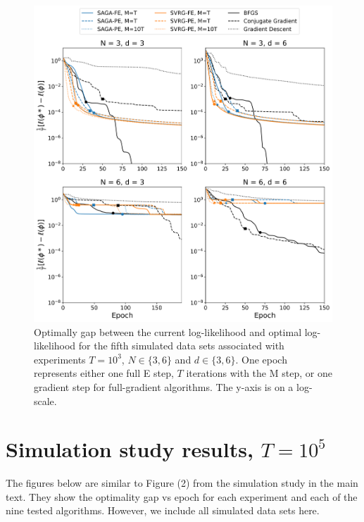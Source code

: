 \documentclass[12pt]{article}
\begin{document}
\begin{figure}[H]
    \centering
    \includegraphics[width=6.5in]{../plt/log-like_v_epoch_T-1000-004.png}
    \caption{Optimally gap between the current log-likelihood and optimal log-likelihood for the fifth simulated data sets associated with experiments $T=10^{3}$, $N \in \{3,6\}$ and $d \in \{3,6\}$. One epoch represents either one full E step, $T$ iterations with the M step, or one gradient step for full-gradient algorithms. The y-axis is on a log-scale.}
\end{figure}

\newpage

\section{Simulation study results, $T = 10^{5}$}

The figures below are similar to Figure (2) from the simulation study in the main text. They show the optimality gap vs epoch for each experiment and each of the nine tested algorithms. However, we include all simulated data sets here.
\end{document}
